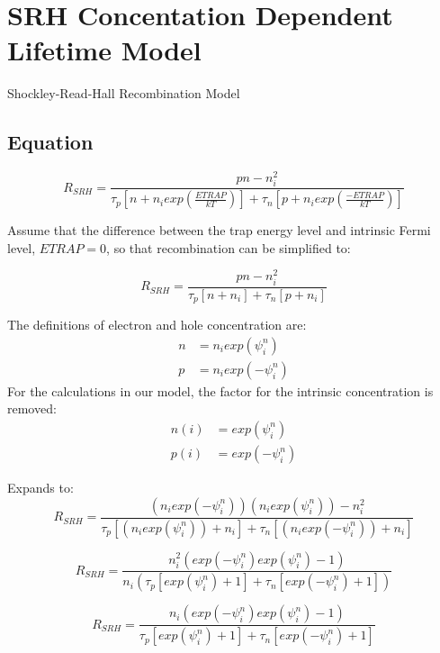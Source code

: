 \documentclass[12pt]{article}
\begin{document}
\section{SRH Concentation Dependent Lifetime Model \cite[p. 3-60 ]{Software1998}}
Shockley-Read-Hall Recombination Model

\subsection{Equation}
\begin{equation}
R_{SRH}=
\frac
{pn-n_{i}^{2}}
{\tau_{p}[n+n_{i}exp(\frac{ETRAP}{k T})]+
	\tau_{n}[p+n_{i}exp(\frac{-ETRAP}{k T})]}
\end{equation}

Assume that the difference between the trap energy level and intrinsic Fermi level, $ETRAP=0$, so that recombination can be simplified to:

\begin{equation}
R_{SRH}=
\frac
{pn-n_{i}^{2}}
{\tau_{p}[n+n_{i}]+
	\tau_{n}[p+n_{i}]}
\end{equation}

The definitions of electron and hole concentration are:
\begin{align}
n &= n_{i} exp(\psi_{i}^{n})
\\
p &= n_{i} exp(-\psi_{i}^{n})
\end{align}
For the calculations in our model, the factor for the intrinsic concentration is removed:
\begin{align}
n(i) &= exp(\psi_{i}^{n})
\\
p(i) &= exp(-\psi_{i}^{n})
\end{align}

Expands to:
\begin{equation}
R_{SRH}=
\frac
{(n_{i} exp(-\psi_{i}^{n}))(n_{i} exp(\psi_{i}^{n}))-n_{i}^{2}}
{\tau_{p}[(n_{i} exp( \psi_{i}^{n}))+n_{i}]+
	\tau_{n}[(n_{i} exp(-\psi_{i}^{n}))+n_{i}]}
\end{equation}

\begin{equation}
R_{SRH}=
\frac
{n_{i}^{2}(exp(-\psi_{i}^{n})exp(\psi_{i}^{n})-1)}
{n_{i}(\tau_{p}[exp( \psi_{i}^{n})+1]+
	\tau_{n}[exp(-\psi_{i}^{n})+1])}
\end{equation}

\begin{equation}
R_{SRH}=
\frac
{n_{i}(exp(-\psi_{i}^{n})exp(\psi_{i}^{n})-1)}
{\tau_{p}[exp( \psi_{i}^{n})+1]+
	\tau_{n}[exp(-\psi_{i}^{n})+1]}
\end{equation}
\end{document}
